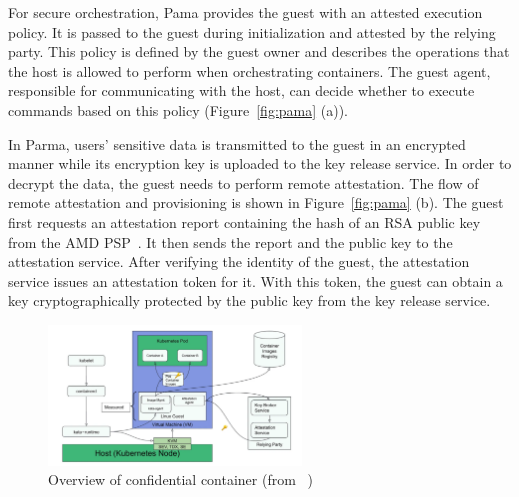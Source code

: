 For secure orchestration, Pama provides the guest with an attested execution policy. It is passed to the guest during initialization and attested by the relying party. This policy is defined by the guest owner and describes the operations that the host is allowed to perform when orchestrating 
containers. The guest agent, responsible for communicating with the host, can decide whether to execute commands based on this policy (Figure~\ref{fig:pama} (a)).  


In Parma, users' sensitive data is transmitted to the guest in an encrypted manner while its encryption key is uploaded to the key release service. In order to decrypt the data, the guest needs to perform remote attestation. The flow of remote attestation and provisioning 
is shown in Figure~\ref{fig:pama} (b). The guest first requests an attestation report containing the hash of an RSA public key from the AMD PSP~\cite*{snp_firmware}. It then sends the report and the public key to the attestation service. After verifying the identity of the guest, 
the attestation service issues an attestation token for it. With this token, the guest can obtain a key cryptographically protected by the public key from the key release service.

 
\begin{figure}[htp]
    \centering
    \includegraphics[width=0.6\textwidth]{images/confidentail_kata.png}
    \caption[Overview of confidential container]{Overview of confidential container (from ~\cite*{confidential_kata})}
    \label{fig:confidentail_kata}
\end{figure}

